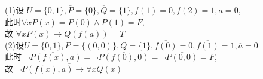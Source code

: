 \documentclass{article}
\begin{document}
(1)设 $U = \{0, 1\}, \overline{P} = \{0\}, \overline{Q} = \{1\}, \overline{f(1)} = 0, \overline{f(2)} = 1, \overline{a} = 0$,\\
此时$\overline{\forall x P(x)} = \overline{P(0)} \wedge \overline{P(1)} = F$,\\    
故 $\overline{\forall x P(x) \to Q(f(a))} = T$ \\
(2)设$U = \{0, 1\}, \overline{P} = \{(0, 0)\}, \overline{Q} = \{1\}, \overline{f(0)} = 0, \overline{f(1)} = 1, \overline{a} = 0$\\
此时 $\overline{\neg P(f(x), a)} = \neg \overline{P(f(0), 0)} = \neg \overline{P(0, 0)} = F$,\\
故 $\overline{\neg P(f(x), a) \to \forall x Q(x)} $
\end{document}
